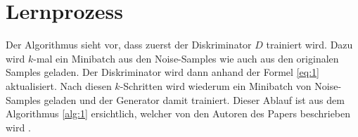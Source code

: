 \section{Lernprozess}
Der Algorithmus sieht vor, dass zuerst der Diskriminator $D$ trainiert wird. Dazu wird $k$-mal ein Minibatch aus
den Noise-Samples wie auch aus den originalen Samples geladen. Der Diskriminator wird dann anhand der Formel \ref{eq:1}
aktualisiert.
Nach diesen $k$-Schritten wird wiederum ein Minibatch von Noise-Samples geladen und der Generator damit trainiert.
Dieser Ablauf ist aus dem Algorithmus \ref{alg:1} ersichtlich, welcher von den Autoren des Papers beschrieben wird \cite{8253599}.

\begin{algorithm}[H] \label{alg:1}
\end{algorithm}

